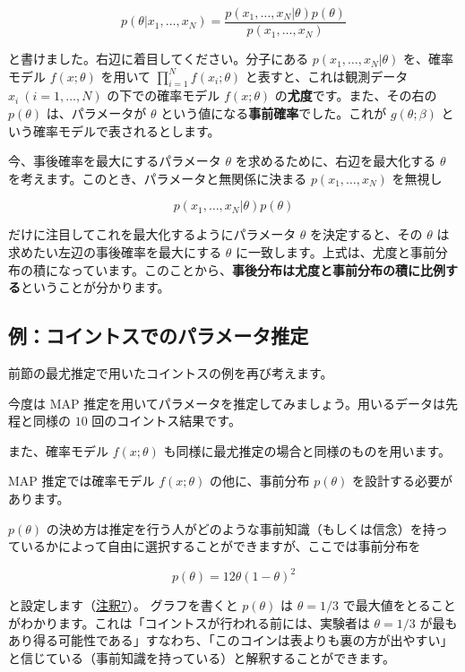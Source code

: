 \[
p(\theta | x_1,\dots,x_N) = \frac{p(x_1,\dots,x_N | \theta) p(\theta)}{p(x_1,\dots,x_N)}
\]


と書けました。右辺に着目してください。分子にある $p(x_1,\dots,x_N | \theta)$ を、確率モデル $f(x; \theta)$ を用いて $\prod_{i=1}^N f(x_i; \theta)$ と表すと、これは観測データ $x_i \ (i=1,\dots,N)$ の下での確率モデル $f(x; \theta)$ の\textbf{尤度}です。また、その右の $p(\theta)$ は、パラメータが $\theta$ という値になる\textbf{事前確率}でした。これが $g(\theta; \beta)$ という確率モデルで表されるとします。


今、事後確率を最大にするパラメータ $\theta$ を求めるために、右辺を最大化する $\theta$ を考えます。このとき、パラメータと無関係に決まる $p(x_1,\dots,x_N)$ を無視し


\[
p(x_1,\dots,x_N | \theta) p(\theta)
\]


だけに注目してこれを最大化するようにパラメータ $\theta$ を決定すると、その $\theta$ は求めたい左辺の事後確率を最大にする $\theta$ に一致します。上式は、尤度と事前分布の積になっています。このことから、\textbf{事後分布は尤度と事前分布の積に比例する}ということが分かります。


\subsection{例：コイントスでのパラメータ推定}


前節の最尤推定で用いたコイントスの例を再び考えます。

今度は MAP 推定を用いてパラメータを推定してみましょう。用いるデータは先程と同様の $10$ 回のコイントス結果です。

また、確率モデル $f(x; \theta)$ も同様に最尤推定の場合と同様のものを用います。

MAP 推定では確率モデル $f(x;\theta)$ の他に、事前分布 $p(\theta)$ を設計する必要があります。

$p(\theta)$ の決め方は推定を行う人がどのような事前知識（もしくは信念）を持っているかによって自由に選択することができますが、ここでは事前分布を


\[
p(\theta) = 12\theta (1-\theta)^2
\]


と設定します（\hyperref[06b-basics-of-probability-statistics-note7]{注釈7}）。 グラフを書くと $p(\theta)$ は $\theta = 1/3$ で最大値をとることがわかります。これは「コイントスが行われる前には、実験者は $\theta=1/3$ が最もあり得る可能性である」すなわち、「このコインは表よりも裏の方が出やすい」と信じている（事前知識を持っている）と解釈することができます。


